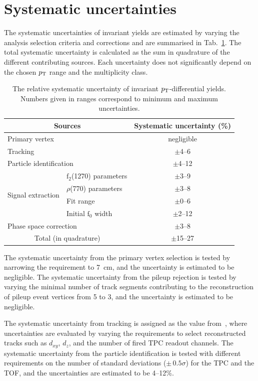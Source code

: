 \section{Systematic uncertainties}
\label{sec:syst}
The systematic uncertainties of invariant yields are estimated by varying the analysis selection criteria and corrections and are summarised in Tab.~\ref{tab:syst}. The total systematic uncertainty is calculated as the sum in quadrature of the different contributing sources. Each uncertainty does not significantly depend on the chosen $p_{\rm{T}}$ range and the multiplicity class.

\begin{table}[h!]
\caption{The relative systematic uncertainty of invariant $p_{\rm{T}}$-differential yields. Numbers given in ranges correspond to minimum and maximum uncertainties.}
\centering
\begin{tabular}{ll|c}
\hline 
\multicolumn{2}{c|}{Sources}  &Systematic uncertainty (\%) \\ \hline
\multicolumn{2}{l|}{Primary vertex} & negligible \\ 
\multicolumn{2}{l|}{Tracking} & $\pm$4--6 \\
\multicolumn{2}{l|}{Particle identification} & $\pm$4--12 \\ 
\multirow{4}{*}{Signal extraction} &  $\mathrm{f}_{2}$(1270) parameters	& $\pm$3--9 \\ 
& $\rho$(770) parameters & $\pm$3--8 \\
& Fit range & $\pm$0--6 \\
& Initial $\mathrm{f}_{0}$ width & $\pm$2--12 \\
\multicolumn{2}{l|}{Phase space correction} & $\pm$3--8 \\ \hline 
\multicolumn{2}{c|}{Total (in quadrature)}	& $\pm$15--27 \\ 
\hline 
\end{tabular}
\label{tab:syst}
\end{table}

The systematic uncertainty from the primary vertex selection is tested by narrowing the requirement to 7~cm, and the uncertainty is estimated to be negligible. The systematic uncertainty from the pileup rejection is tested by varying the minimal number of track segments contributing to the reconstruction of pileup event vertices from 5 to 3, and the uncertainty is estimated to be negligible.

The systematic uncertainty from tracking is assigned as the value from~\cite{ALICE:2013wgn}, where uncertainties are evaluated by varying the requirements to select reconstructed tracks such as $d_{xy}$, $d_{z}$, and the number of fired TPC readout channels. The systematic uncertainty from the particle identification is tested with different requirements on the number of standard deviations ($\pm\,0.5\sigma$) for the TPC and the TOF, and the uncertainties are estimated to be 4--12\%.

